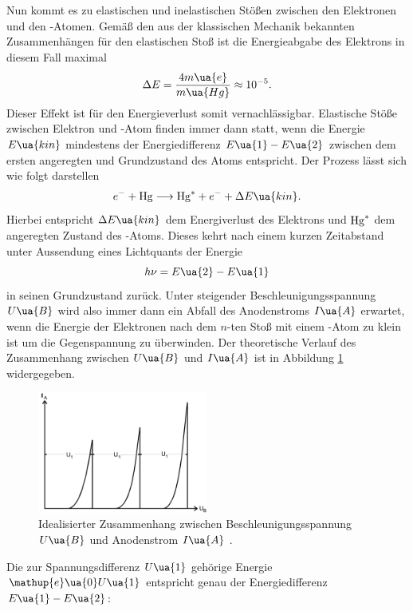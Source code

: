 Nun kommt es zu elastischen und inelastischen Stößen zwischen den Elektronen und den -Atomen. Gemäß
den aus der klassischen Mechanik bekannten Zusammenhängen für den elastischen Stoß ist die Energieabgabe
des Elektrons in diesem Fall maximal
\begin{equation}
  \Delta E = \frac{4 m\ua{e}}{m\ua{Hg}} \approx \num{e-5}.
\end{equation}
Dieser Effekt ist für den Energieverlust somit vernachlässigbar. Elastische Stöße zwischen Elektron und
-Atom finden immer dann statt, wenn die Energie $E\ua{kin}$ mindestens der Energiedifferenz $E\ua{1} - E\ua{2}$
zwischen dem ersten angeregten und Grundzustand des  Atoms entspricht. Der Prozess lässt sich wie folgt darstellen
\begin{equation}
  e^{-} + \ce{Hg} \longrightarrow \ce{Hg}^{*} + e^{-} + \Delta E\ua{kin}.
\end{equation}
Hierbei entspricht $\Delta E\ua{kin}$ dem Energiverlust des Elektrons und $\ce{Hg}^*$ dem angeregten Zustand des
-Atoms. Dieses kehrt nach einem kurzen Zeitabstand unter Aussendung eines Lichtquants der Energie
\begin{equation}
  h\nu = E\ua{2} - E\ua{1}
\end{equation}
in seinen Grundzustand zurück. Unter steigender Beschleunigungsspannung $U\ua{B}$ wird also immer dann ein
Abfall des Anodenstroms $I\ua{A}$ erwartet, wenn die Energie der Elektronen nach dem $n$-ten Stoß mit einem
-Atom zu klein ist um die Gegenspannung zu überwinden. Der theoretische Verlauf des Zusammenhang zwischen
$U\ua{B}$ und $I\ua{A}$ ist in Abbildung \ref{fig: theo_verlauf} widergegeben.
\begin{figure}
  \centering
  \includegraphics[width = 0.5\textwidth]{pics/theo_verlauf.png}
  \caption{Idealisierter Zusammenhang zwischen Beschleunigungsspannung $U\ua{B}$ und Anodenstrom $I\ua{A}$ \cite{}.}
  \label{fig: theo_verlauf}
\end{figure}
Die zur Spannungsdifferenz $U\ua{1}$ gehörige
Energie $\mathup{e}\ua{0}U\ua{1}$ entspricht genau der Energiedifferenz $E\ua{1} - E\ua{2}$:
